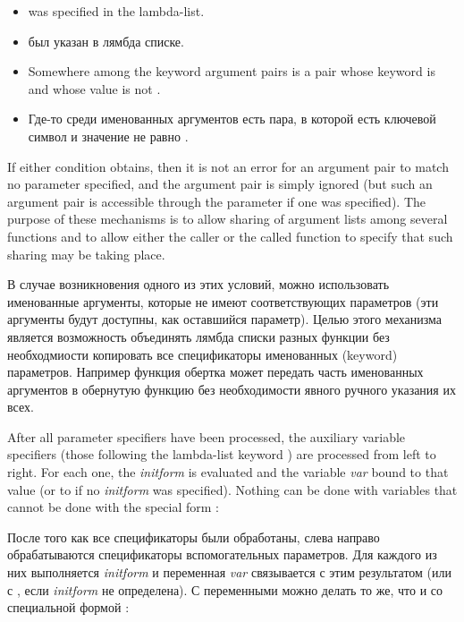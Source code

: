 \begin{itemize}
\item
{} was specified in the lambda-list.

\item
{} был указан в лямбда списке.

\item
Somewhere among the keyword argument pairs is a pair whose keyword
is  and whose value is not {\false}.

\item
Где-то среди именованных аргументов есть пара, в которой есть ключевой символ
 и значение не равно {\false}.
\end{itemize}
If either condition obtains, then it is not an error
for an argument pair to match no parameter specified,
and the argument pair is simply ignored (but such an
argument pair is accessible through the  parameter if
one was specified). The purpose of these mechanisms is to
allow sharing of argument lists among several functions
and to allow either the caller or the called function
to specify that such sharing may be taking place.

В случае возникновения одного из этих условий, можно использовать именованные
аргументы, которые не имеют соответствующих параметров (эти аргументы будут
доступны, как оставшийся  параметр). 
Целью этого механизма является возможность объединять лямбда списки разных
функции без необходмиости копировать все спецификаторы именованных (keyword)
параметров. Например функция обертка может передать часть именованных аргументов
в обернутую функцию без необходимости явного ручного указания их всех. 

After all parameter specifiers have been processed, the auxiliary
variable specifiers (those following the lambda-list keyword ) are processed from
left to right.  For each one, the \textit{initform} is evaluated and the
variable \textit{var} bound to that value (or to {\false} if no \textit{initform} was
specified).  Nothing can be done with  variables that cannot be
done with the special form :

После того как все спецификаторы были обработаны, слева направо обрабатываются
спецификаторы вспомогательных параметров. Для каждого из них выполняется
\textit{initform} и переменная \textit{var} связывается с этим результатом (или
с {\false}, если \textit{initform} не определена). С  переменными
можно делать то же, что и со специальной формой :

